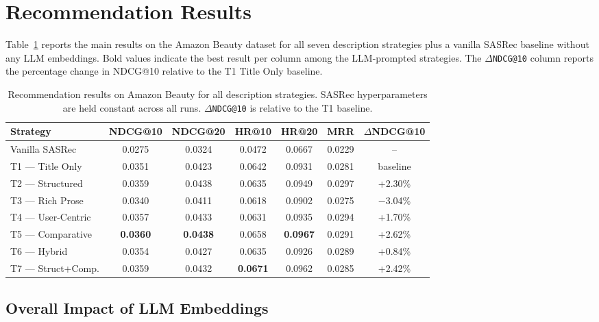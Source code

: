 \documentclass[12pt,a4paper]{report}
\begin{document}
\section{Recommendation Results}
\label{sec:pc_results}

Table~\ref{tab:promptcraft_results} reports the main results on the Amazon
Beauty dataset for all seven description strategies plus a vanilla SASRec
baseline without any LLM embeddings. Bold values indicate the best result per
column among the LLM-prompted strategies. The $\Delta$\texttt{NDCG@10} column
reports the percentage change in NDCG@10 relative to the T1 Title Only
baseline.

\begin{table}[h]
\centering
\caption{Recommendation results on Amazon Beauty for all description
strategies. SASRec hyperparameters are held constant across all runs.
$\Delta$\texttt{NDCG@10} is relative to the T1 baseline.}
\label{tab:promptcraft_results}
\small
\begin{tabular}{p{2.4cm} c c c c c c}
\toprule
\textbf{Strategy} & \textbf{NDCG@10} &
\textbf{NDCG@20} & \textbf{HR@10} & \textbf{HR@20} & \textbf{MRR} &
$\Delta$\textbf{NDCG@10} \\
\midrule
Vanilla SASRec & 0.0275 & 0.0324 & 0.0472 & 0.0667 & 0.0229 & -- \\
\midrule
T1 — Title Only    & 0.0351 & 0.0423 & 0.0642 & 0.0931 & 0.0281 & baseline \\
T2 — Structured    & 0.0359 & 0.0438 & 0.0635 & 0.0949 & 0.0297 & +2.30\% \\
T3 — Rich Prose    & 0.0340 & 0.0411 & 0.0618 & 0.0902 & 0.0275 & $-$3.04\% \\
T4 — User-Centric  & 0.0357 & 0.0433 & 0.0631 & 0.0935 & 0.0294 & +1.70\% \\
T5 — Comparative   & \textbf{0.0360} & \textbf{0.0438} & 0.0658 & \textbf{0.0967} & 0.0291 & +2.62\% \\
T6 — Hybrid        & 0.0354 & 0.0427 & 0.0635 & 0.0926 & 0.0289 & +0.84\% \\
T7 — Struct+Comp.  & 0.0359 & 0.0432 & \textbf{0.0671} & 0.0962 & 0.0285 & +2.42\% \\
\bottomrule
\end{tabular}
\end{table}

\subsection*{Overall Impact of LLM Embeddings}
\end{document}

